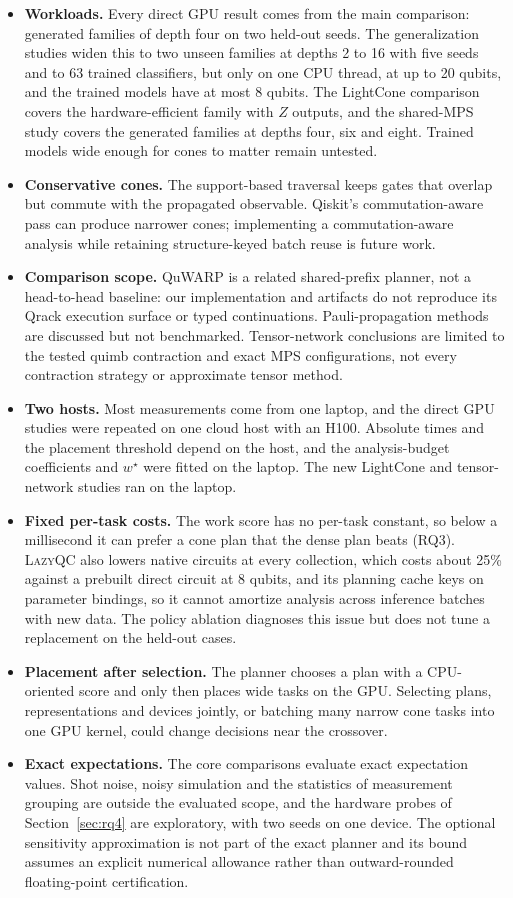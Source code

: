 \begin{itemize}
\item \textbf{Workloads.} Every direct GPU result comes from the main comparison: generated families of depth four on two held-out seeds. The generalization studies widen this to two unseen families at depths 2 to 16 with five seeds and to 63 trained classifiers, but only on one CPU thread, at up to 20 qubits, and the trained models have at most 8 qubits. The LightCone comparison covers the hardware-efficient family with $Z$ outputs, and the shared-MPS study covers the generated families at depths four, six and eight. Trained models wide enough for cones to matter remain untested.
\item \textbf{Conservative cones.} The support-based traversal keeps gates that overlap but commute with the propagated observable. Qiskit's commutation-aware pass can produce narrower cones; implementing a commutation-aware analysis while retaining structure-keyed batch reuse is future work.
\item \textbf{Comparison scope.} QuWARP is a related shared-prefix planner, not a head-to-head baseline: our implementation and artifacts do not reproduce its Qrack execution surface or typed continuations. Pauli-propagation methods are discussed but not benchmarked. Tensor-network conclusions are limited to the tested quimb contraction and exact MPS configurations, not every contraction strategy or approximate tensor method.
\item \textbf{Two hosts.} Most measurements come from one laptop, and the direct GPU studies were repeated on one cloud host with an H100. Absolute times and the placement threshold depend on the host, and the analysis-budget coefficients and $w^\star$ were fitted on the laptop. The new LightCone and tensor-network studies ran on the laptop.
\item \textbf{Fixed per-task costs.} The work score has no per-task constant, so below a millisecond it can prefer a cone plan that the dense plan beats (RQ3). \textsc{LazyQC} also lowers native circuits at every collection, which costs about 25\% against a prebuilt direct circuit at 8 qubits, and its planning cache keys on parameter bindings, so it cannot amortize analysis across inference batches with new data. The policy ablation diagnoses this issue but does not tune a replacement on the held-out cases.
\item \textbf{Placement after selection.} The planner chooses a plan with a CPU-oriented score and only then places wide tasks on the GPU. Selecting plans, representations and devices jointly, or batching many narrow cone tasks into one GPU kernel, could change decisions near the crossover.
\item \textbf{Exact expectations.} The core comparisons evaluate exact expectation values. Shot noise, noisy simulation and the statistics of measurement grouping are outside the evaluated scope, and the hardware probes of Section~\ref{sec:rq4} are exploratory, with two seeds on one device. The optional sensitivity approximation is not part of the exact planner and its bound assumes an explicit numerical allowance rather than outward-rounded floating-point certification.
\end{itemize}

